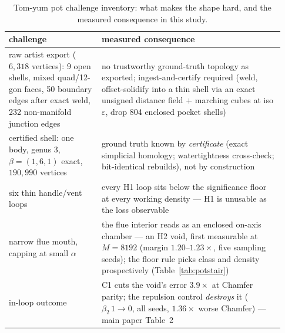 \begin{table}[tb]
\centering
\caption{Tom-yum pot challenge inventory: what makes the shape hard, and
the measured consequence in this study.}
\label{tab:potchal}
\footnotesize
\setlength{\tabcolsep}{3pt}
\renewcommand{\arraystretch}{1.15}
\begin{tabular}{p{0.315\linewidth}p{0.615\linewidth}}
\toprule
challenge & measured consequence \\
\midrule
raw artist export ($6{,}318$ vertices): 9 open shells, mixed quad/12-gon
faces, 50 boundary
edges after exact weld, 232 non-manifold junction edges & no trustworthy
ground-truth topology as exported; ingest-and-certify required (weld,
offset-solidify into a thin shell via an exact unsigned distance field
$+$ marching cubes at iso $\varepsilon$, drop 804 enclosed pocket
shells) \\
certified shell: one body, genus 3, $\beta{=}(1,6,1)$ exact,
$190{,}990$ vertices & ground truth known by \emph{certificate} (exact
simplicial homology; watertightness cross-check; bit-identical
rebuilds), not by construction \\
six thin handle/vent loops & every H1 loop sits below the significance
floor at every working density --- H1 is unusable as the loss
observable \\
narrow flue mouth, capping at small $\alpha$ & the flue interior reads
as an enclosed on-axis chamber --- an H2 void, first measurable at
$M{=}8192$ (margin $1.20$--$1.23\times$, five sampling seeds); the
floor rule picks class and density prospectively
(Table~\ref{tab:potstair}) \\
in-loop outcome & C1 cuts the void's error $3.9\times$ at Chamfer
parity; the repulsion control \emph{destroys} it ($\beta_2\,1{\to}0$,
all seeds, $1.36\times$ worse Chamfer) --- main paper Table~2 \\
\bottomrule
\end{tabular}
\end{table}

